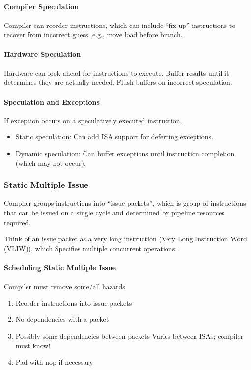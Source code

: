 \paragraph{Compiler Speculation}
Compiler can reorder instructions, which can include ``fix-up'' instructions to recover from incorrect guess. e.g., move load before branch. 

\paragraph{Hardware Speculation}
Hardware can look ahead for instructions to execute. Buffer results until it determines they are actually needed. Flush buffers on incorrect speculation. 

\paragraph{Speculation and Exceptions}
If exception occurs on a speculatively executed instruction, 
\begin{itemize}\small
    \item Static speculation: Can add ISA support for deferring exceptions. 
    \item Dynamic speculation: Can buffer exceptions until instruction completion (which may not occur). 
\end{itemize}

\subsubsection{Static Multiple Issue}
Compiler groups instructions into ``issue packets'', which is group of instructions that can be issued on a single cycle and determined by pipeline resources required. 

Think of an issue packet as a very long instruction (Very Long Instruction Word (VLIW)), which Specifies multiple concurrent operations .

\paragraph{Scheduling Static Multiple Issue}
Compiler must remove some/all hazards
\begin{enumerate}
    \item Reorder instructions into issue packets
    \item No dependencies with a packet
    \item Possibly some dependencies between packets
    \subitem Varies between ISAs; compiler must know!
    \item Pad with nop if necessary    
\end{enumerate}

